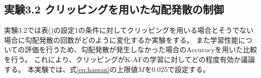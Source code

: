 \subsection{実験3.2 クリッピングを用いた勾配発散の制御}
実験3.2では表(\label{exp:boston})の設定1の条件に対してクリッピングを用いる場合とそうでない場合に勾配発散の回数がどのように変化するか実験をする。
また学習性能についての評価を行うため、勾配発散が発生しなかった場合のAccuracyを用いた比較を行う。
これにより、クリッピングがK-AFの学習に対してどの程度有効か議論する。
本実験では、式\ref{eq:hassan}の上限値$ M $を0.025で設定する。


